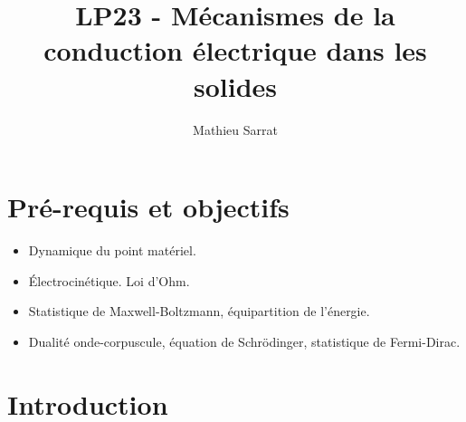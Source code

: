 \documentclass[11pt,a4paper]{report}
\author{Mathieu Sarrat}
\title{LP23 - Mécanismes de la conduction électrique dans les solides}
\begin{document}
\maketitle

\section*{Pré-requis et objectifs}

\begin{itemize}
	\item Dynamique du point matériel.
	\item Électrocinétique. Loi d'Ohm.
	\item Statistique de Maxwell-Boltzmann, équipartition de l'énergie.
	\item Dualité onde-corpuscule, équation de Schrödinger, statistique de Fermi-Dirac.
\end{itemize}

\newpage
\section*{Introduction}
\end{document}
